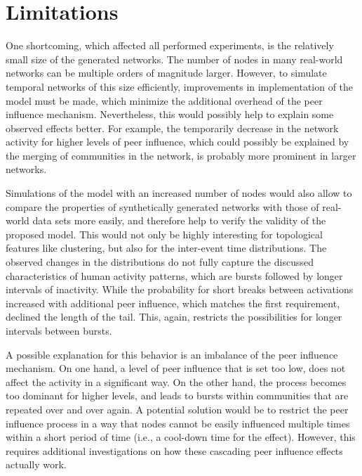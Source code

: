 

\section{Limitations}
\label{sec:limitations}

One shortcoming, which affected all performed experiments, is the relatively small size of the generated networks.
The number of nodes in many real-world networks can be multiple orders of magnitude larger.
However, to simulate temporal networks of this size efficiently, improvements in implementation of the model must be made, which minimize the additional overhead of the peer influence mechanism.
Nevertheless, this would possibly help to explain some observed effects better.
For example, the temporarily decrease in the network activity for higher levels of peer influence, which could possibly be explained by the merging of communities in the network, is probably more prominent in larger networks.

Simulations of the model with an increased number of nodes would also allow to compare the properties of synthetically generated networks with those of real-world data sets more easily, and therefore help to verify the validity of the proposed model.
This would not only be highly interesting for topological features like clustering, but also for the inter-event time distributions.
The observed changes in the distributions do not fully capture the discussed characteristics of human activity patterns, which are bursts followed by longer intervals of inactivity.
While the probability for short breaks between activations increased with additional peer influence, which matches the first requirement, declined the length of the tail.
This, again, restricts the possibilities for longer intervals between bursts.

A possible explanation for this behavior is an imbalance of the peer influence mechanism.
On one hand, a level of peer influence that is set too low, does not affect the activity in a significant way.
On the other hand, the process becomes too dominant for higher levels, and leads to bursts within communities that are repeated over and over again.
A potential solution would be to restrict the peer influence process in a way that nodes cannot be easily influenced multiple times within a short period of time (i.e., a cool-down time for the effect).
However, this requires additional investigations on how these cascading peer influence effects actually work.


